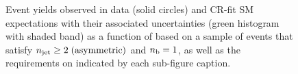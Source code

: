 \begin{figure}[h!]
\begin{center}
    \caption{Event yields observed in data (solid circles) and CR-fit SM expectations with their associated uncertainties (green histogram with shaded band) as a function of \HTmiss based on a sample of events that satisfy $n_{\text{jet}} \geq 2 \; \textrm{(asymmetric)}$ and $n_{\text{b}} = 1$, as well as the requirements on \scalht indicated by each sub-figure caption. }
    \label{fig:mhtdim_ge2a_eq1b}
  \end{center}
\end{figure}


